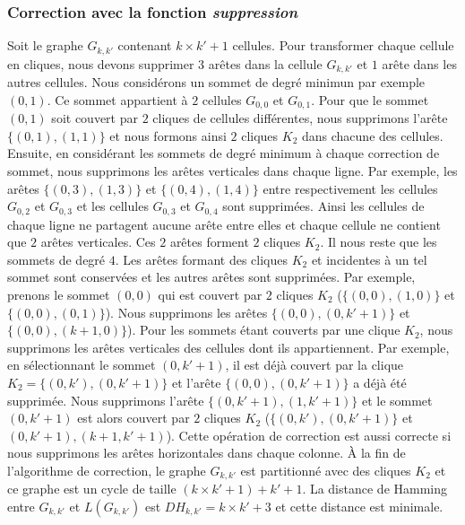 \subsubsection{Correction avec la fonction {\em suppression}}
Soit le graphe $G_{k,k'}$ contenant $k \times k' + 1$ cellules.
Pour transformer chaque cellule en cliques, nous devons supprimer $3$ ar\^etes dans la cellule $G_{k,k'}$ et $1$ ar\^ete dans les autres cellules.
Nous consid\'erons un sommet  de degr\'e minimun par exemple$(0,1)$. Ce sommet appartient \`a $2$ cellules  $G_{0,0}$ et $G_{0,1}$. Pour que le sommet $(0,1)$ soit couvert par $2$ cliques de cellules diff\'erentes, nous supprimons l'ar\^ete $\{(0,1),(1,1)\}$ et nous formons ainsi $2$ cliques $K_2$ dans chacune des cellules. 
\newline
Ensuite, en consid\'erant les sommets de degr\'e minimum \`a chaque correction de sommet, nous supprimons les ar\^etes verticales dans chaque ligne. 
Par exemple, les ar\^etes $\{(0,3),(1,3)\}$ et $\{(0,4),(1,4)\}$ entre respectivement les cellules $G_{0,2}$ et  $G_{0,3}$ et  les cellules $G_{0,3}$ et  $G_{0,4}$ sont supprim\'ees. Ainsi les cellules de chaque ligne ne partagent aucune ar\^ete entre elles et chaque cellule ne contient que $2$ ar\^etes verticales. Ces $2$ ar\^etes forment $2$ cliques $K_2$.
\newline
Il nous reste que les sommets de degr\'e $4$. Les ar\^etes formant des cliques $K_2$  et incidentes \`a un tel sommet sont conserv\'ees et les autres ar\^etes sont supprim\'ees.  Par exemple, prenons le sommet $(0,0)$ qui est couvert par $2$ cliques $K_2$ ($\{(0,0),(1,0)\}$ et $\{(0,0),(0,1)\}$). Nous supprimons les ar\^etes  $\{(0,0),(0,k'+1)\}$ et $\{(0,0),(k+1,0)\}$).
\newline
Pour les sommets \'etant couverts par une clique $K_2$, nous supprimons les ar\^etes verticales des cellules dont ils appartiennent. Par exemple, en s\'electionnant le sommet $(0,k'+1)$, il est d\'ej\`a couvert par la clique $K_2 = \{(0,k'),(0,k'+1)\}$ et l'ar\^ete $\{(0,0),(0,k'+1)\}$ a d\'ej\`a \'et\'e supprim\'ee. Nous supprimons l'ar\^ete  $\{(0,k'+1), (1, k'+1)\}$ et le sommet  $(0,k'+1)$ est alors couvert par $2$ cliques $K_2$ ($\{(0,k'),(0,k'+1)\}$ et $(0,k'+1),(k+1,k'+1)$).
\newline
Cette op\'eration de correction est aussi correcte si nous supprimons les ar\^etes horizontales dans chaque colonne. 
\newline
\`A la fin de l'algorithme de correction, le graphe $G_{k,k'}$ est partitionn\'e avec des cliques $K_2$ et ce graphe est un cycle de taille $(k \times k'+1) + k' + 1$.
La distance de Hamming   entre $G_{k,k'}$ et $L(G_{k,k'})$ est $DH_{k,k'} = k \times k' +3 $ et cette distance est minimale.

